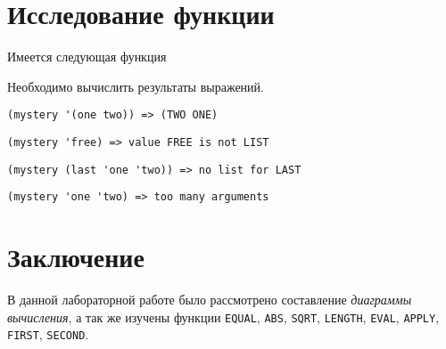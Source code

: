 \section{Исследование функции}

Имеется следующая функция


\noindent
Необходимо вычислить результаты выражений.


\problem \hfill
\begin{lstlisting}
(mystery '(one two)) => (TWO ONE)
\end{lstlisting}


\problem \hfill
\begin{lstlisting}
(mystery 'free) => value FREE is not LIST
\end{lstlisting}


\problem \hfill
\begin{lstlisting}
(mystery (last 'one 'two)) => no list for LAST
\end{lstlisting}


\problem \hfill
\begin{lstlisting}
(mystery 'one 'two) => too many arguments
\end{lstlisting}



\section{Заключение}

В данной лабораторной работе было рассмотрено составление \textit{диаграммы вычисления}, а так же изучены функции \verb|EQUAL|, \verb|ABS|, \verb|SQRT|, \verb|LENGTH|, \verb|EVAL|, \verb|APPLY|, \verb|FIRST|, \verb|SECOND|.
